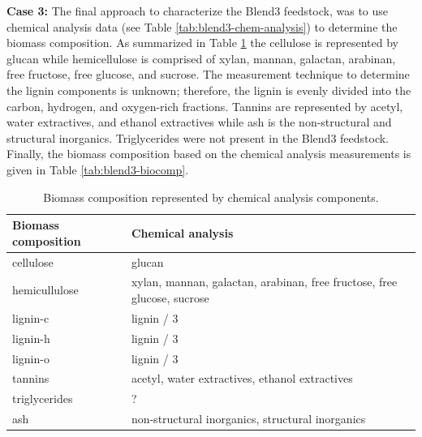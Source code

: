 \textbf{Case 3:} The final approach to characterize the Blend3 feedstock, was to use chemical analysis data (see Table \ref{tab:blend3-chem-analysis}) to determine the biomass composition. As summarized in Table \ref{tab:biocomp-chem} the cellulose is represented by glucan while hemicellulose is comprised of xylan, mannan, galactan, arabinan, free fructose, free glucose, and sucrose. The measurement technique to determine the lignin components is unknown; therefore, the lignin is evenly divided into the carbon, hydrogen, and oxygen-rich fractions. Tannins are represented by acetyl, water extractives, and ethanol extractives while ash is the non-structural and structural inorganics. Triglycerides were not present in the Blend3 feedstock. Finally, the biomass composition based on the chemical analysis measurements is given in Table \ref{tab:blend3-biocomp}.

\begin{table}[H]
    \centering
    \caption{Biomass composition represented by chemical analysis components.}
    \label{tab:biocomp-chem}
    \begin{tabular}{lp{3in}}
        \toprule
        Biomass composition & Chemical analysis \\
        \midrule
        cellulose     & glucan \\
        \addlinespace[0.1in]
        hemicullulose & xylan, mannan, galactan, arabinan, free fructose, free glucose, sucrose \\
        \addlinespace[0.1in]
        lignin-c      & lignin / 3 \\
        \addlinespace[0.1in]
        lignin-h      & lignin / 3 \\
        \addlinespace[0.1in]
        lignin-o      & lignin / 3 \\
        \addlinespace[0.1in]
        tannins       & acetyl, water extractives, ethanol extractives \\
        \addlinespace[0.1in]
        triglycerides & ? \\
        \addlinespace[0.1in]
        ash           & non-structural inorganics, structural inorganics \\
        \bottomrule
    \end{tabular}
\end{table}

